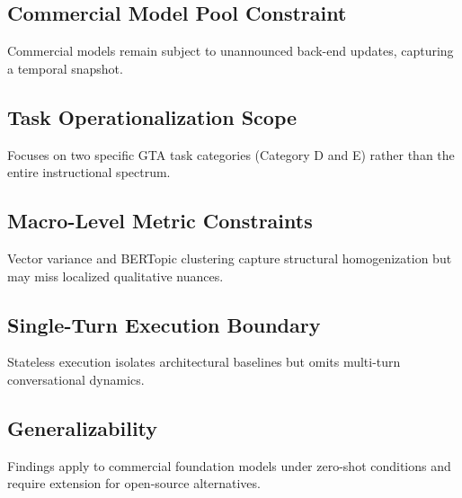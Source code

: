 \subsection{Commercial Model Pool Constraint}
Commercial models remain subject to unannounced back-end updates, capturing a temporal snapshot.

\subsection{Task Operationalization Scope}
Focuses on two specific GTA task categories (Category D and E) rather than the entire instructional spectrum.

\subsection{Macro-Level Metric Constraints}
Vector variance and BERTopic clustering capture structural homogenization but may miss localized qualitative nuances.

\subsection{Single-Turn Execution Boundary}
Stateless execution isolates architectural baselines but omits multi-turn conversational dynamics.

\subsection{Generalizability}
Findings apply to commercial foundation models under zero-shot conditions and require extension for open-source alternatives.
